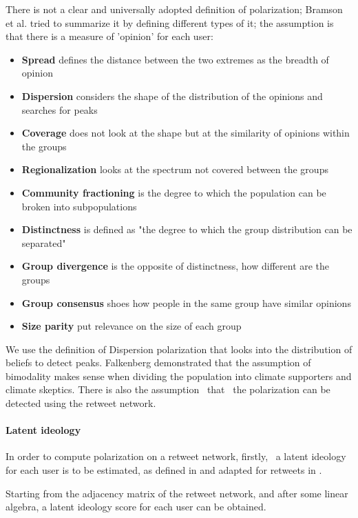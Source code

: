 There is not a clear and universally adopted definition of polarization; Bramson et al. \cite{bramson_understanding_2017} tried to summarize it by defining different types of it; the assumption is that there is a measure of ’opinion’ for each user: 
\begin{itemize}
    \item \textbf{Spread} defines the distance between the two extremes as the breadth of opinion
    \item \textbf{Dispersion} considers the shape of the distribution of the opinions and searches for peaks
    \item \textbf{Coverage} does not look at the shape but at the similarity of opinions within the groups
    \item \textbf{Regionalization} looks at the spectrum not covered between the groups
    \item \textbf{Community fractioning} is the degree to which the population can be broken into subpopulations
    \item \textbf{Distinctness} is defined as  "the degree to which the group distribution can be separated"
    \item \textbf{Group divergence} is the opposite of distinctness, how different are the groups
    \item  \textbf{Group consensus} shoes how people in the same group have similar opinions
    \item  \textbf{Size parity } put relevance on the size of each group
\end{itemize}



We use the definition of Dispersion polarization that looks into the distribution of beliefs to detect peaks. Falkenberg demonstrated that the assumption of bimodality makes sense when dividing the population into climate supporters and climate skeptics. There is also the assumption  that  the polarization can be detected using the retweet network.

\paragraph{Latent ideology}
In order to compute polarization on a retweet network, firstly,  a latent ideology for each user is to be estimated, as defined in \cite{barbera_birds_2015} and adapted for retweets in \cite{flamino_shifting_2021}.


Starting from the adjacency matrix of the retweet network, and after some linear algebra, a latent ideology score for each user can be obtained.


